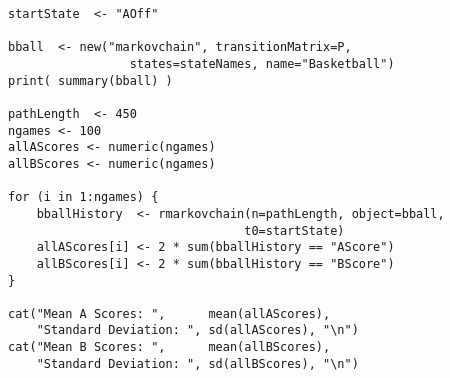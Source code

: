\begin{description}
\begin{lstlisting}
startState  <- "AOff"

bball  <- new("markovchain", transitionMatrix=P,
                 states=stateNames, name="Basketball")
print( summary(bball) )

pathLength  <- 450
ngames <- 100
allAScores <- numeric(ngames)
allBScores <- numeric(ngames)

for (i in 1:ngames) {
    bballHistory  <- rmarkovchain(n=pathLength, object=bball,
                                 t0=startState)
    allAScores[i] <- 2 * sum(bballHistory == "AScore")
    allBScores[i] <- 2 * sum(bballHistory == "BScore")
}

cat("Mean A Scores: ",      mean(allAScores),
    "Standard Deviation: ", sd(allAScores), "\n")
cat("Mean B Scores: ",      mean(allBScores),
    "Standard Deviation: ", sd(allBScores), "\n")

\end{lstlisting}












\end{description}



